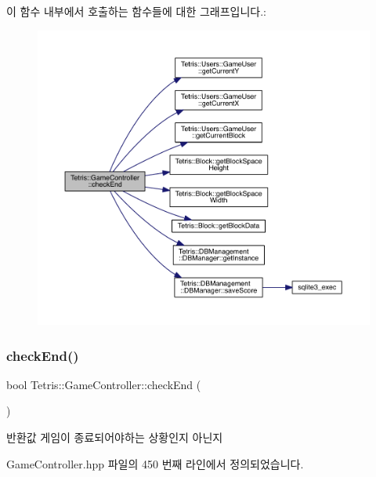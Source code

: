 이 함수 내부에서 호출하는 함수들에 대한 그래프입니다.\+:
\nopagebreak
\begin{figure}[H]
\begin{center}
\leavevmode
\includegraphics[width=350pt]{db/dd2/class_tetris_1_1_game_controller_ac8058c827eaa393194dcfb83c6964f8a_cgraph}
\end{center}
\end{figure}
\mbox{\label{class_tetris_1_1_game_controller_ac8058c827eaa393194dcfb83c6964f8a}} 
\subsubsection{\texorpdfstring{check\+End()}{checkEnd()}\hspace{0.1cm}{\footnotesize\ttfamily [2/2]}}
{\footnotesize\ttfamily bool Tetris\+::\+Game\+Controller\+::check\+End (\begin{DoxyParamCaption}{ }\end{DoxyParamCaption})\hspace{0.3cm}{\ttfamily [inline]}}

\begin{DoxyReturn}{반환값}
게임이 종료되어야하는 상황인지 아닌지 
\end{DoxyReturn}


Game\+Controller.\+hpp 파일의 450 번째 라인에서 정의되었습니다.


